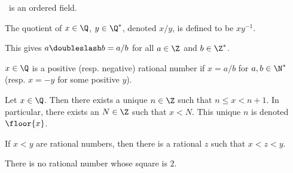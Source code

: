 \begin{theorem}
    \Q\ is an ordered field.
\end{theorem}

\begin{definition}
    The quotient of $x \in \Q$, $y \in \Q^*$, denoted $x / y$, is defined to
    be $x y^{-1}$.
\end{definition}
This gives $a \doubleslash b = a / b$ for all $a \in \Z$ and $b \in \Z^*$.

\begin{definition}
    $x \in \Q$ is a positive (resp. negative) rational number if $x = a / b$
    for $a, b \in \N^*$ (resp. $x = -y$ for some positive $y$).
\end{definition}

\begin{proposition}
    Let $x \in \Q$.
    Then there exists a unique $n \in \Z$ such that $n \le x < n + 1$.
    In particular, there exists an $N \in \Z$ such that $x < N$.
    This unique $n$ is denoted $\floor{x}$.
\end{proposition}

\begin{proposition}
    If $x < y$ are rational numbers, then there is a rational $z$ such that
    $x < z < y$.
\end{proposition}

\begin{theorem}
    There is no rational number whose square is $2$.
\end{theorem}
